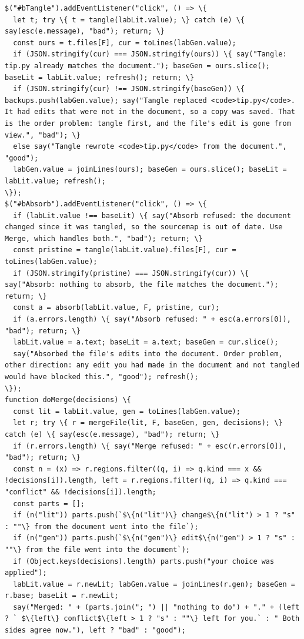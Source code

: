\documentclass[10pt,a4paper]{article}
\begin{document}
\begin{Verbatim}
$("#bTangle").addEventListener("click", () => \{
  let t; try \{ t = tangle(labLit.value); \} catch (e) \{ say(esc(e.message), "bad"); return; \}
  const ours = t.files[F], cur = toLines(labGen.value);
  if (JSON.stringify(cur) === JSON.stringify(ours)) \{ say("Tangle: tip.py already matches the document."); baseGen = ours.slice(); baseLit = labLit.value; refresh(); return; \}
  if (JSON.stringify(cur) !== JSON.stringify(baseGen)) \{ backups.push(labGen.value); say("Tangle replaced <code>tip.py</code>. It had edits that were not in the document, so a copy was saved. That is the order problem: tangle first, and the file's edit is gone from view.", "bad"); \}
  else say("Tangle rewrote <code>tip.py</code> from the document.", "good");
  labGen.value = joinLines(ours); baseGen = ours.slice(); baseLit = labLit.value; refresh();
\});
$("#bAbsorb").addEventListener("click", () => \{
  if (labLit.value !== baseLit) \{ say("Absorb refused: the document changed since it was tangled, so the sourcemap is out of date. Use Merge, which handles both.", "bad"); return; \}
  const pristine = tangle(labLit.value).files[F], cur = toLines(labGen.value);
  if (JSON.stringify(pristine) === JSON.stringify(cur)) \{ say("Absorb: nothing to absorb, the file matches the document."); return; \}
  const a = absorb(labLit.value, F, pristine, cur);
  if (a.errors.length) \{ say("Absorb refused: " + esc(a.errors[0]), "bad"); return; \}
  labLit.value = a.text; baseLit = a.text; baseGen = cur.slice();
  say("Absorbed the file's edits into the document. Order problem, other direction: any edit you had made in the document and not tangled would have blocked this.", "good"); refresh();
\});
function doMerge(decisions) \{
  const lit = labLit.value, gen = toLines(labGen.value);
  let r; try \{ r = mergeFile(lit, F, baseGen, gen, decisions); \} catch (e) \{ say(esc(e.message), "bad"); return; \}
  if (r.errors.length) \{ say("Merge refused: " + esc(r.errors[0]), "bad"); return; \}
  const n = (x) => r.regions.filter((q, i) => q.kind === x && !decisions[i]).length, left = r.regions.filter((q, i) => q.kind === "conflict" && !decisions[i]).length;
  const parts = [];
  if (n("lit")) parts.push(`$\{n("lit")\} change$\{n("lit") > 1 ? "s" : ""\} from the document went into the file`);
  if (n("gen")) parts.push(`$\{n("gen")\} edit$\{n("gen") > 1 ? "s" : ""\} from the file went into the document`);
  if (Object.keys(decisions).length) parts.push("your choice was applied");
  labLit.value = r.newLit; labGen.value = joinLines(r.gen); baseGen = r.base; baseLit = r.newLit;
  say("Merged: " + (parts.join("; ") || "nothing to do") + "." + (left ? ` $\{left\} conflict$\{left > 1 ? "s" : ""\} left for you.` : " Both sides agree now."), left ? "bad" : "good");

\end{Verbatim}
\end{document}
